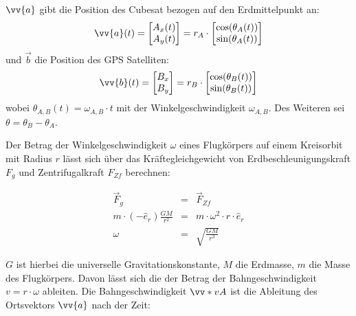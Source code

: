 
$\vv{a}$ gibt die Position des Cubesat bezogen auf den Erdmittelpunkt an:
\begin{equation}
    \vv{a}(t)=\begin{bmatrix} 
        A_x(t)\\ 
        A_y(t) 
    \end{bmatrix} = 
    r_A \cdot \begin{bmatrix} 
        \cos(\theta_A(t))\\ 
        \sin(\theta_A(t)) 
    \end{bmatrix}
\end{equation}
und $\vec{b}$ die Position des GPS Satelliten:
\begin{equation}
    \vv{b}(t)=\begin{bmatrix} 
        B_x\\ 
        B_y 
    \end{bmatrix} = 
    r_B \cdot \begin{bmatrix} 
        \cos(\theta_B(t))\\ 
        \sin(\theta_B(t)) 
    \end{bmatrix}
\end{equation}
wobei $\theta_{A,B}(t)=\omega_{A,B} \cdot t$ mit der Winkelgeschwindigkeit $\omega_{A,B}$. Des Weiteren sei $\theta = \theta_B-\theta_A$.

Der Betrag der Winkelgeschwindigkeit $\omega$ eines Flugkörpers auf einem Kreisorbit mit Radius $r$ lässt sich über das Kräftegleichgewicht von Erdbeschleunigungskraft $F_g$ und Zentrifugalkraft $F_{Zf}$ berechnen:

\begin{eqnarray}
    \vec{F}_g &=& \vec{F}_{Zf} \\
    m \cdot (-\hat{e}_r) \frac{G M}{r^2} &=& m \cdot \omega^2 \cdot r \cdot \hat{e}_r\\
    \omega &=& \sqrt{\frac{G M}{r^3}}
\end{eqnarray}

$G$ ist hierbei die universelle Gravitationskonstante, $M$ die Erdmasse, $m$ die Masse des Flugkörpers. Davon lässt sich die der Betrag der Bahngeschwindigkeit $v=r \cdot \omega$ ableiten. Die Bahngeschwindigkeit $\vv*{v}{A}$ ist die Ableitung des Ortsvektors $\vv{a}$ nach der Zeit:

